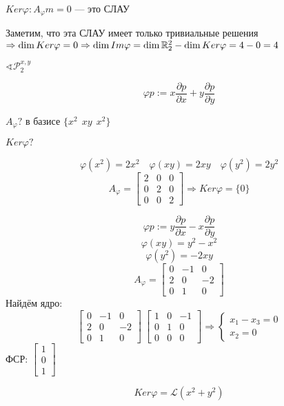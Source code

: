 \begin{example}
    $Ker\varphi : A_\varphi m=0$ --- это СЛАУ

    Заметим, что эта СЛАУ имеет только тривиальные решения $\Rightarrow \dim Ker \varphi =0 \Rightarrow \dim Im \varphi = \dim \mathbb{R}_2^2 - \dim Ker \varphi = 4 - 0 = 4$
\end{example}

\begin{example}
    $\sphericalangle \mathcal{P}^{x,y}_2$

    $$\varphi p := x\frac{\partial p}{\partial x} + y\frac{\partial p}{\partial y}$$

    $A_\varphi?$ в базисе $\{x^2 \ \ xy \ \ x^2\}$

    $Ker \varphi?$

    $$\varphi(x^2)=2x^2 \quad \varphi(xy) = 2xy \quad \varphi(y^2)=2y^2$$
    $$A_\varphi=\begin{bmatrix}
        2 & 0 & 0 \\
        0 & 2 & 0 \\
        0 & 0 & 2
    \end{bmatrix} \Rightarrow Ker \varphi = \{0\}$$
\end{example}

\begin{example}
    $$\varphi p := y\frac{\partial p}{\partial x} - x\frac{\partial p}{\partial y}$$
    $$\varphi(xy) = y^2-x^2$$
    $$\varphi(y^2) = -2xy$$
    $$A_\varphi = \begin{bmatrix}
        0 & -1 & 0 \\
        2 & 0 & -2 \\
        0 & 1 & 0
    \end{bmatrix}$$
    Найдём ядро:
    $$\begin{bmatrix}
        0 & -1 & 0 \\
        2 & 0 & -2 \\
        0 & 1 & 0
    \end{bmatrix} ~ \begin{bmatrix}
        1 & 0 & -1 \\
        0 & 1 & 0 \\
        0 & 0 & 0
    \end{bmatrix} \Rightarrow \begin{cases}
        x_1 - x_3 = 0 \\
        x_2 = 0
    \end{cases}$$
    ФСР: $\begin{bmatrix}
        1 \\ 0 \\ 1
    \end{bmatrix}$

    $$Ker \varphi = \mathscr{L}(x^2+y^2)$$
\end{example}

